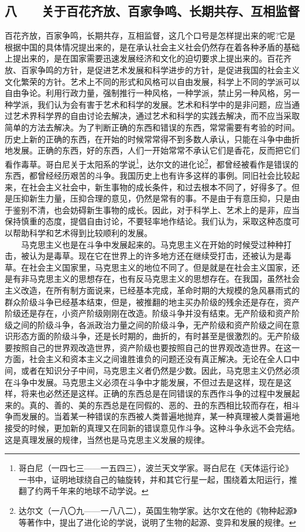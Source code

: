\documentclass[cn,11pt,chinese]{elegantbook}
\def\myformat#1{\hfil\hfil #1}
\begin{document}
\subsection*{\myformat{八　　关于百花齐放、百家争鸣、长期共存、互相监督}}
百花齐放，百家争鸣，长期共存，互相监督，这几个口号是怎样提出来的呢?它是根据中国的具体情况提出来的，是在承认社会主义社会仍然存在着各种矛盾的基础上提出来的，是在国家需要迅速发展经济和文化的迫切要求上提出来的。百花齐放、百家争鸣的方针，是促进艺术发展和科学进步的方针，是促进我国的社会主义文化繁荣的方针。艺术上不同的形式和风格可以自由发展，科学上不同的学派可以自由争论。利用行政力量，强制推行一种风格，一种学派，禁止另一种风格，另一种学派，我们认为会有害于艺术和科学的发展。艺术和科学中的是非问题，应当通过艺术界科学界的自由讨论去解决，通过艺术和科学的实践去解决，而不应当采取简单的方法去解决。为了判断正确的东西和错误的东西，常常需要有考验的时间。历史上新的正确的东西，在开始的时候常常得不到多数人承认，只能在斗争中曲折地发展。正确的东西，好的东西，人们一开始常常不承认它们是香花，反而把它们看作毒草。哥白尼关于太阳系的学说\footnote[1]{ 哥白尼（一四七三——一五四三），波兰天文学家。哥白尼在《天体运行论》一书中，证明地球绕自己的轴旋转，并和其它行星一起，围绕着太阳运行，推翻了约两千年来的地球不动学说。}，达尔文的进化论\footnote[2]{ 达尔文（一八〇九——一八八二），英国生物学家。达尔文在他的《物种起源》等著作中，提出了进化论的学说，说明了生物的起源、变异和发展的规律。}，都曾经被看作是错误的东西，都曾经经历艰苦的斗争。我国历史上也有许多这样的事例。同旧社会比较起来，在社会主义社会中，新生事物的成长条件，和过去根本不同了，好得多了。但是压抑新生力量，压抑合理的意见，仍然是常有的事。不是由于有意压抑，只是由于鉴别不清，也会妨碍新生事物的成长。因此，对于科学上、艺术上的是非，应当保持慎重的态度，提倡自由讨论，不要轻率地作结论。我们认为，采取这种态度可以帮助科学和艺术得到比较顺利的发展。\\
　　马克思主义也是在斗争中发展起来的。马克思主义在开始的时候受过种种打击，被认为是毒草。现在它在世界上的许多地方还在继续受打击，还被认为是毒草。在社会主义国家里，马克思主义的地位不同了。但是就是在社会主义国家，还是有非马克思主义的思想存在，也有反马克思主义的思想存在。在我国，虽然社会主义改造，在所有制方面说来，已经基本完成，革命时期的大规模的急风暴雨式的群众阶级斗争已经基本结束，但是，被推翻的地主买办阶级的残余还是存在，资产阶级还是存在，小资产阶级刚刚在改造。阶级斗争并没有结束。无产阶级和资产阶级之间的阶级斗争，各派政治力量之间的阶级斗争，无产阶级和资产阶级之间在意识形态方面的阶级斗争，还是长时期的，曲折的，有时甚至是很激烈的。无产阶级要按照自己的世界观改造世界，资产阶级也要按照自己的世界观改造世界。在这一方面，社会主义和资本主义之间谁胜谁负的问题还没有真正解决。无论在全人口中间，或者在知识分子中间，马克思主义者仍然是少数。因此，马克思主义仍然必须在斗争中发展。马克思主义必须在斗争中才能发展，不但过去是这样，现在是这样，将来也必然还是这样。正确的东西总是在同错误的东西作斗争的过程中发展起来的。真的、善的、美的东西总是在同假的、恶的、丑的东西相比较而存在，相斗争而发展的。当着某一种错误的东西被人类普遍地抛弃，某一种真理被人类普遍地接受的时候，更加新的真理又在同新的错误意见作斗争。这种斗争永远不会完结。这是真理发展的规律，当然也是马克思主义发展的规律。\\
\end{document}
